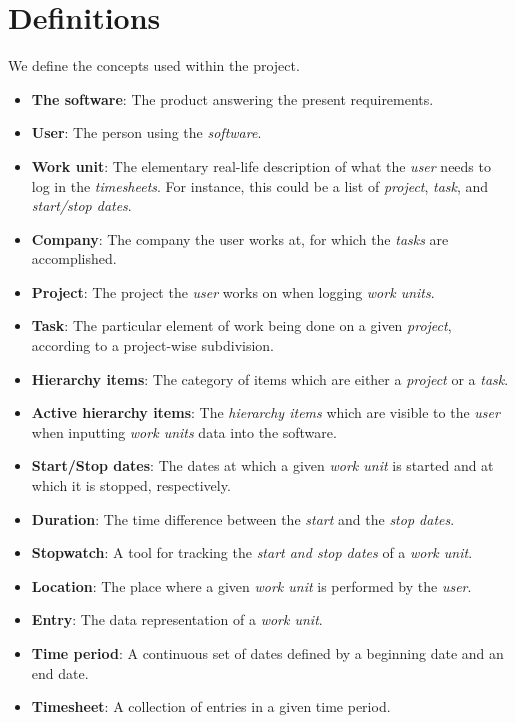 \section{Definitions}
We define the concepts used within the project.

\begin{itemize}
\item \textbf{The software}: The product answering the present requirements.
\item \textbf{User}: The person using the \emph{software}.
\item \textbf{Work unit}: The elementary real-life description of what the
  \emph{user} needs to log in the \emph{timesheets}. For instance, this could be
  a list of \emph{project}, \emph{task}, and \emph{start/stop dates}.
\item \textbf{Company}: The company the user works at, for which the
  \emph{tasks} are accomplished.
\item \textbf{Project}: The project the \emph{user} works on when logging
  \emph{work units}.
\item \textbf{Task}: The particular element of work being done on a given
  \emph{project}, according to a project-wise subdivision.
\item \textbf{Hierarchy items}: The category of items which are either a
  \emph{project} or a \emph{task}.
\item \textbf{Active hierarchy items}: The \emph{hierarchy items} which are
  visible to the \emph{user} when inputting \emph{work units} data into the
  software.
\item \textbf{Start/Stop dates}: The dates at which a given \emph{work unit} is
  started and at which it is stopped, respectively.
\item \textbf{Duration}: The time difference between the \emph{start} and the
  \emph{stop dates}.
\item \textbf{Stopwatch}: A tool for tracking the \emph{start and stop dates} of
  a \emph{work unit}.
\item \textbf{Location}: The place where a given \emph{work unit} is performed
  by the \emph{user}.
\item \textbf{Entry}: The data representation of a \emph{work unit}.
\item \textbf{Time period}: A continuous set of dates defined by a beginning
  date and an end date.
\item \textbf{Timesheet}: A collection of entries in a given time period.
\end{itemize}